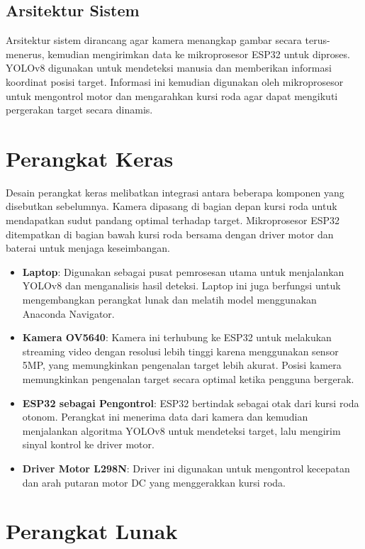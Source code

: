 \subsection{Arsitektur Sistem}
\label{subsec:arsitektursistem}

Arsitektur sistem dirancang agar kamera menangkap gambar secara terus-menerus, kemudian mengirimkan data ke mikroprosesor ESP32 untuk diproses. YOLOv8 digunakan untuk mendeteksi manusia dan memberikan informasi koordinat posisi target. Informasi ini kemudian digunakan oleh mikroprosesor untuk mengontrol motor dan mengarahkan kursi roda agar dapat mengikuti pergerakan target secara dinamis.

\section{Perangkat Keras}
\label{sec:perangkathardware}

Desain perangkat keras melibatkan integrasi antara beberapa komponen yang disebutkan sebelumnya. Kamera dipasang di bagian depan kursi roda untuk mendapatkan sudut pandang optimal terhadap target. Mikroprosesor ESP32 ditempatkan di bagian bawah kursi roda bersama dengan driver motor dan baterai untuk menjaga keseimbangan.

\begin{itemize}
    \item \textbf{Laptop}: Digunakan sebagai pusat pemrosesan utama untuk menjalankan YOLOv8 dan menganalisis hasil deteksi. Laptop ini juga berfungsi untuk mengembangkan perangkat lunak dan melatih model menggunakan Anaconda Navigator.
    \item \textbf{Kamera OV5640}: Kamera ini terhubung ke ESP32 untuk melakukan streaming video dengan resolusi lebih tinggi karena menggunakan sensor 5MP, yang memungkinkan pengenalan target lebih akurat. Posisi kamera memungkinkan pengenalan target secara optimal ketika pengguna bergerak.
    \item \textbf{ESP32 sebagai Pengontrol}: ESP32 bertindak sebagai otak dari kursi roda otonom. Perangkat ini menerima data dari kamera dan kemudian menjalankan algoritma YOLOv8 untuk mendeteksi target, lalu mengirim sinyal kontrol ke driver motor.
    \item \textbf{Driver Motor L298N}: Driver ini digunakan untuk mengontrol kecepatan dan arah putaran motor DC yang menggerakkan kursi roda.
\end{itemize}

\section{Perangkat Lunak}
\label{sec:perangkatlunak}

